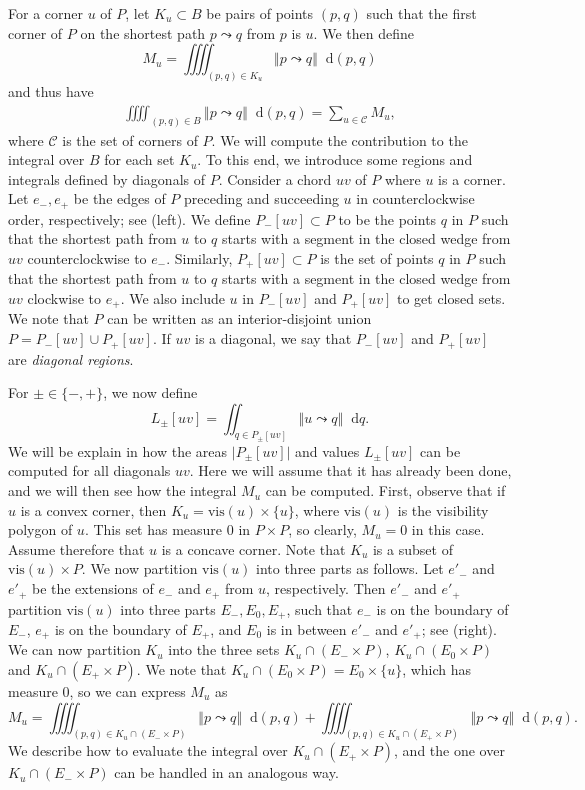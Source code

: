 \documentclass{article}
\newcommand*\diff{\mathop{}\!\mathrm{d}}
\newcommand{\vis}{\textrm{vis}}
\begin{document}
For a corner $u$ of $P$, let $K_u\subset B$ be pairs of points $(p,q)$ such that the first corner of $P$ on the shortest path $p\leadsto q$ from $p$ is $u$.
We then define
\[
M_u=\iiiint_{(p,q)\in K_u} \left\Vert p \leadsto q\right\Vert \diff (p,q)
\]
and thus have
\begin{align}
\iiiint_{(p,q)\in B} \left\Vert p \leadsto q\right\Vert \diff (p,q) =
\sum_{u\in\mathcal C} M_u, \label{eq:wienerCornerInt}
\end{align}
where $\mathcal C$ is the set of corners of $P$.
We will compute the contribution to the integral over $B$ for each set $K_u$.
To this end, we introduce some regions and integrals defined by diagonals of $P$.
Consider a chord $uv$ of $P$ where $u$ is a corner.
Let $e_-,e_+$ be the edges of $P$ preceding and succeeding $u$ in counterclockwise order, respectively; see  (left).
We define $P_-[uv]\subset P$ to be the points $q$ in $P$ such that the shortest path from $u$ to $q$ starts with a segment in the closed wedge from $uv$ counterclockwise to $e_-$.
Similarly, $P_+[uv]\subset P$ is the set of points $q$ in $P$ such that the shortest path from $u$ to $q$ starts with a segment in the closed wedge from $uv$ clockwise to $e_+$.
We also include $u$ in $P_-[uv]$ and $P_+[uv]$ to get closed sets.
We note that $P$ can be written as an interior-disjoint union $P=P_-[uv]\cup P_+[uv]$.
If $uv$ is a diagonal, we say that $P_-[uv]$ and $P_+[uv]$ are \emph{diagonal regions}.

For $\pm\in\{-,+\}$, we now define
\[
L_\pm[uv] = \iint_{q\in P_\pm[uv]} \left\Vert u \leadsto q\right\Vert \diff q.
\]
We will be explain in  how the areas $\vert P_\pm[uv] \vert$ and values $L_\pm[uv]$ can be computed for all diagonals $uv$.
Here we will assume that it has already been done, and we will then see how the integral $M_u$ can be computed.
First, observe that if $u$ is a convex corner, then $K_u= \vis(u)\times \{u\}$, where $\vis(u)$ is the visibility polygon of $u$.
This set has measure $0$ in $P\times P$, so clearly, $M_u=0$ in this case.
Assume therefore that $u$ is a concave corner.
Note that $K_u$ is a subset of $\vis(u)\times P$.
We now partition $\vis(u)$ into three parts as follows.
Let $e'_-$ and $e'_+$ be the extensions of $e_-$ and $e_+$ from $u$, respectively.
Then $e'_-$ and $e'_+$ partition $\vis(u)$ into three parts $E_-,E_0,E_+$, such that $e_-$ is on the boundary of $E_-$, $e_+$ is on the boundary of $E_+$, and $E_0$ is in between $e'_-$ and $e'_+$; see  (right).
We can now partition $K_u$ into the three sets $K_u\cap (E_-\times P)$, $K_u\cap (E_0\times P)$ and $K_u\cap (E_+\times P)$.
We note that $K_u\cap (E_0\times P)=E_0\times\{u\}$, which has measure $0$, so we can express $M_u$ as
\[
M_u =
\iiiint_{(p,q)\in K_u\cap (E_-\times P)} \left\Vert p \leadsto q\right\Vert \diff (p,q) + \iiiint_{(p,q)\in K_u\cap (E_+\times P)} \left\Vert p \leadsto q\right\Vert \diff (p,q).
\]
We describe how to evaluate the integral over $K_u\cap (E_+\times P)$, and the one over $K_u\cap (E_-\times P)$ can be handled in an analogous way.
\end{document}
